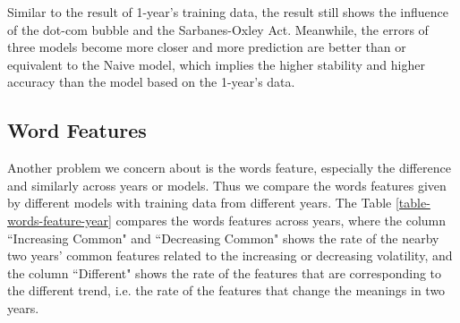 \documentclass[11pt]{article}
\begin{document}
Similar to the result of 1-year's training data, the result still shows the influence of the dot-com bubble and the Sarbanes-Oxley Act. Meanwhile, the errors of three models become more closer and more prediction are better than or equivalent to the Naive model, which implies the higher stability and higher accuracy than the model based on the 1-year's data.

\subsection{Word Features}

Another problem we concern about is the words feature, especially the difference and similarly across years or models. Thus we compare the words features given by different models with training data from different years. The Table \ref{table-words-feature-year} compares the words features across years, where the column ``Increasing Common" and ``Decreasing Common" shows the rate of the nearby two years' common features related to the increasing or decreasing volatility, and the column ``Different" shows the rate of the features that are corresponding to the different trend, i.e. the rate of the features that change the meanings in two years.
\end{document}
